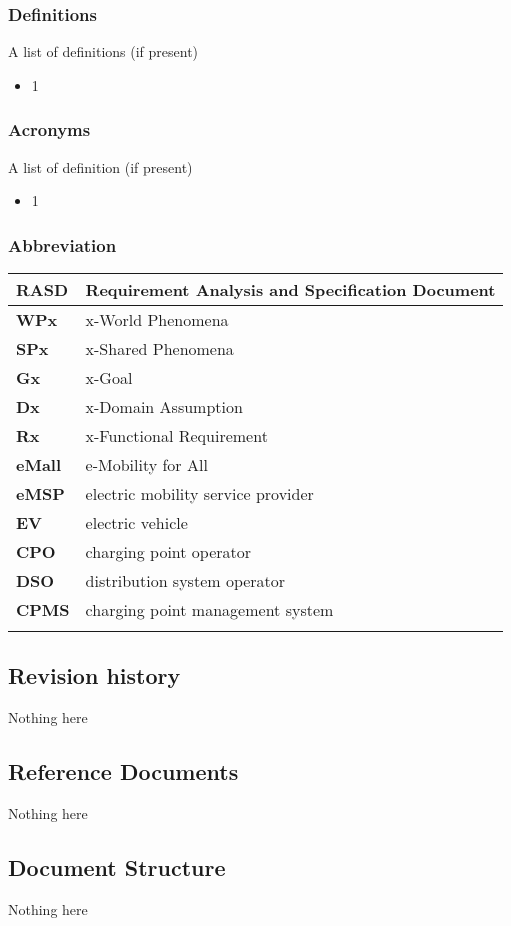 \subsubsection*{Definitions}
A list of definitions (if present)
\begin{itemize}
    \item 1
\end{itemize}
\subsubsection*{Acronyms}
A list of definition (if present)
\begin{itemize}
    \item 1
\end{itemize}
\subsubsection*{Abbreviation}
\begin{table}[h]
    \begin{tabular}{|l|l|}
        \toprule
        \textbf{RASD}  & Requirement Analysis and Specification Document \\ \midrule
        \textbf{WPx}   & x-World Phenomena                               \\ \midrule
        \textbf{SPx}   & x-Shared Phenomena                              \\ \midrule
        \textbf{Gx}    & x-Goal                                          \\ \midrule
        \textbf{Dx}    & x-Domain Assumption                             \\ \midrule
        \textbf{Rx}    & x-Functional Requirement                        \\ \midrule
        \textbf{eMall} & e-Mobility for All                              \\ \midrule
        \textbf{eMSP}  & electric mobility service provider              \\ \midrule
        \textbf{EV}    & electric vehicle                                \\ \midrule
        \textbf{CPO}   & charging point operator                         \\ \midrule
        \textbf{DSO}   & distribution system operator                    \\ \midrule
        \textbf{CPMS}  & charging point management system                \\ \midrule
                       &                                                 \\ \bottomrule
    \end{tabular}
\end{table}
\subsection{Revision history}
Nothing here

\subsection{Reference Documents}
Nothing here

\subsection{Document Structure}
Nothing here
